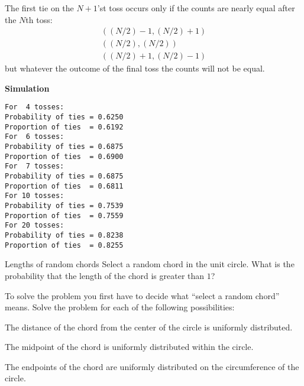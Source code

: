 
 The first tie on the $N+1$'st toss occurs only if the counts are nearly equal after the $N$th toss:
\[
\begin{array}{l}
((N/2)-1,(N/2)+1)\\((N/2),(N/2))\\((N/2)+1,(N/2)-1)
\end{array}
\]
but whatever the outcome of the final toss the counts will not be equal.

\textbf{Simulation}
\begin{verbatim}
For  4 tosses:
Probability of ties = 0.6250
Proportion of ties  = 0.6192
For  6 tosses:
Probability of ties = 0.6875
Proportion of ties  = 0.6900
For  7 tosses:
Probability of ties = 0.6875
Proportion of ties  = 0.6811
For 10 tosses:
Probability of ties = 0.7539
Proportion of ties  = 0.7559
For 20 tosses:
Probability of ties = 0.8238
Proportion of ties  = 0.8255
\end{verbatim}






\begin{prob}{Lengths of random chords}
Select a random chord in the unit circle. What is the probability that the length of the chord is greater than $1$?

To solve the problem you first have to decide what ``select a random chord'' means. Solve the problem for each of the following possibilities:

 The distance of the chord from the center of the circle is uniformly distributed.

 The midpoint of the chord is uniformly distributed within the circle.

 The endpoints of the chord are uniformly distributed on the circumference of the circle.
\end{prob}

\solution{}

